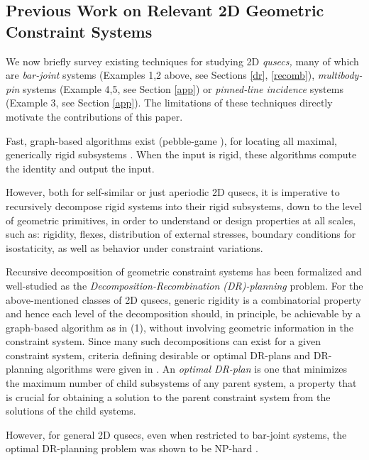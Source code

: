 \subsection{Previous Work on Relevant 2D Geometric Constraint Systems} We
now briefly survey existing techniques for studying 2D {\em qusecs,}  many
of which are {\it bar-joint} systems (Examples 1,2 above, see Sections
\ref{dr}, \ref{recomb}),
{\it multibody-pin} systems (Example 4,5, see Section \ref{app}) or  {\it
pinned-line incidence} systems (Example 3, see Section \ref{app}). The
limitations of these techniques directly motivate
the contributions of this paper.

\medskip\noindent{}
Fast, graph-based algorithms exist (pebble-game \cite{XX}),
for locating all maximal, generically rigid subsystems \cite{XX}.
When the input is rigid, these algorithms compute the identity and  output
the input.

However, both for self-similar or just aperiodic 2D qusecs, it is
imperative to recursively decompose rigid systems
into their rigid subsystems, down to the level of
geometric primitives, in order to
understand or design properties at all scales, such as:
rigidity, flexes, distribution
of external stresses, boundary conditions for isostaticity,
as well as behavior under constraint variations.

\medskip\noindent{}
Recursive decomposition of geometric constraint systems has been
formalized \cite{XX} and well-studied \cite{XX}
as the {\sl Decomposition-Recombination (DR)-planning} problem.
For the above-mentioned classes of 2D qusecs, generic rigidity is
a combinatorial property and hence each level of the decomposition should,
in principle, be achievable by a graph-based algorithm as in (1), without
involving geometric information in the constraint system.
Since many  such decompositions can exist for a given constraint system,
criteria defining desirable or optimal DR-plans and DR-planning algorithms
were given in \cite{XX}. An {\em optimal DR-plan} is one
that minimizes the maximum number of child subsystems of any parent
system, a property that is
crucial for obtaining a solution to the parent constraint system from the
solutions of the child systems.

However, for general 2D qusecs, even when restricted to bar-joint systems,
the optimal DR-planning problem was shown to be NP-hard \cite{XX}.

